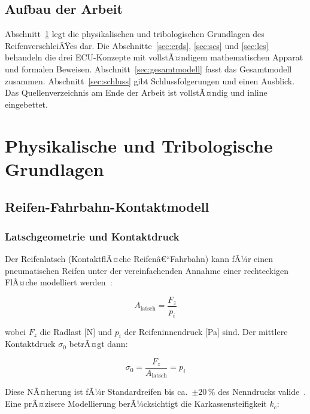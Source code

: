 ﻿\documentclass[12pt,a4paper]{article}
\theoremstyle{definition}
\theoremstyle{remark}
\newcommand{\Fz}{F_z}
\begin{document}
\subsection{Aufbau der Arbeit}

Abschnitt~\ref{sec:grundlagen} legt die physikalischen und tribologischen Grundlagen
des ReifenverschleiÃŸes dar. Die Abschnitte~\ref{sec:crds}, \ref{sec:scs} und
\ref{sec:lcs} behandeln die drei ECU-Konzepte mit vollstÃ¤ndigem mathematischen Apparat
und formalen Beweisen. Abschnitt~\ref{sec:gesamtmodell} fasst das Gesamtmodell zusammen.
Abschnitt~\ref{sec:schluss} gibt Schlussfolgerungen und einen Ausblick.
Das Quellenverzeichnis am Ende der Arbeit ist vollstÃ¤ndig und inline eingebettet.

\section{Physikalische und Tribologische Grundlagen}
\label{sec:grundlagen}

\subsection{Reifen-Fahrbahn-Kontaktmodell}

\subsubsection{Latschgeometrie und Kontaktdruck}

Der Reifenlatsch (KontaktflÃ¤che Reifenâ€“Fahrbahn) kann fÃ¼r einen pneumatischen
Reifen unter der vereinfachenden Annahme einer rechteckigen FlÃ¤che modelliert
werden~\cite{Pacejka2012}:

\begin{equation}
  A_{\mathrm{latsch}} = \frac{\Fz}{p_i}
  \label{eq:latsch}
\end{equation}

wobei $\Fz$ die Radlast [\si{\newton}] und $p_i$ der Reifeninnendruck
[\si{\pascal}] sind. Der mittlere Kontaktdruck $\sigma_0$ betrÃ¤gt dann:

\begin{equation}
  \sigma_0 = \frac{\Fz}{A_{\mathrm{latsch}}} = p_i
  \label{eq:kontaktdruck}
\end{equation}

Diese NÃ¤herung ist fÃ¼r Standardreifen bis ca.\ $\pm 20$\,\% des Nenndrucks
valide~\cite{Gent2006}. Eine prÃ¤zisere Modellierung berÃ¼cksichtigt die
Karkassensteifigkeit $k_c$:
\end{document}
